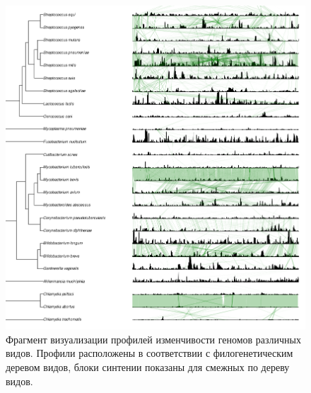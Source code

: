 \begin{figure}[!ht] 
  \center
    \includegraphics[width=\textwidth]{Dissertation/images/complexity/tree_fragment.png}
  \caption{Фрагмент визуализации профилей изменчивости геномов различных видов. Профили расположены в соответствии с филогенетическим деревом видов, блоки синтении показаны для смежных по дереву видов.}
  \label{img:tree_fragment} 
\end{figure}


